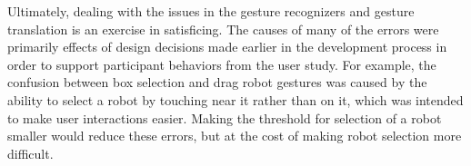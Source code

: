Ultimately, dealing with the issues in the gesture recognizers and gesture translation is an exercise in satisficing. 
The causes of many of the errors were primarily effects of design decisions made earlier in the development process in order to support participant behaviors from the user study. 
For example, the confusion between box selection and drag robot gestures was caused by the ability to select a robot by touching near it rather than on it, which was intended to make user interactions easier. 
Making the threshold for selection of a robot smaller would reduce these errors, but at the cost of making robot selection more difficult. 

%


